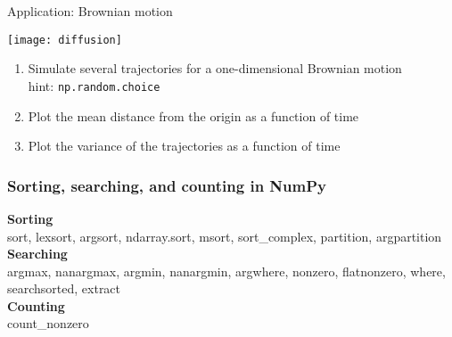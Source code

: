 \begin{frame}{Application: Brownian motion}
 \begin{center}
  \texttt{[image: diffusion]}
 \end{center}

 \begin{enumerate}
  \item Simulate several trajectories for a one-dimensional Brownian motion\\
        hint: \lstinline{np.random.choice}
  \item Plot the mean distance from the origin as a function of time\\
  \item Plot the variance of the trajectories as a function of time
 \end{enumerate}

\end{frame}

\begin{frame}[fragile]\frametitle{Sorting, searching, and counting in NumPy}
 
 \textbf{Sorting}\\
 \small{sort, lexsort, argsort, ndarray.sort, msort, sort\_complex, partition,
        argpartition}\\[0.2truecm]
 \textbf{Searching}\\
 \small{argmax, nanargmax, argmin, nanargmin, argwhere, nonzero, flatnonzero,
        where, searchsorted, extract}\\[0.2truecm]
 \textbf{Counting}\\
 \small{count\_nonzero}
\end{frame}

